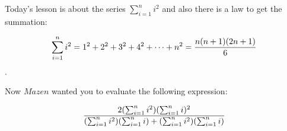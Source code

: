 Today's lesson is about the series ${\sum_{i = 1}^n i^2}$
and also there is a law to get the summation:

$${\sum_{i = 1}^n i^2} = 1^2 + 2^2 + 3^2 + 4^2 + \cdots + n^2 = \large\frac{n (n + 1) (2 n+1)} {6}$$.

Now $Mazen$ wanted you to evaluate the following expression:

$$\huge\frac{2({\sum_{i = 1}^n i^2})({\sum_{i = 1}^n i})^2}
{({\sum_{i = 1}^n i^2})({\sum_{i = 1}^n i}) + ({\sum_{i = 1}^n i^2})({\sum_{i = 1}^n i})} $$